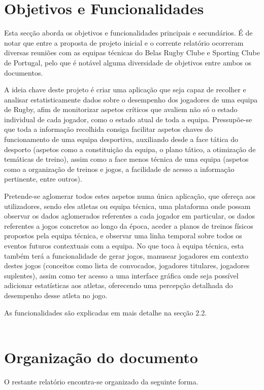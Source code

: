%
%
\section{Objetivos e Funcionalidades}\label{sec12} 

Esta secção aborda os objetivos e funcionalidades principais e secundários. É de notar que entre a proposta de projeto inicial e o corrente relatório ocorreram diversas reuniões com as equipas técnicas do Belas Rugby Clube e Sporting Clube de Portugal, pelo que é notável alguma diversidade de objetivos entre ambos os documentos.

A ideia chave deste projeto é criar uma aplicação que seja capaz de recolher e analisar estatisticamente dados sobre o desempenho dos jogadores de uma equipa de Rugby, afim de monitorizar aspetos críticos que avaliem não só o estado individual de cada jogador, como o estado atual de toda a equipa. Pressupõe-se que toda a informação recolhida consiga facilitar aspetos chaves do funcionamento de uma equipa desportiva, auxiliando desde a face tática do desporto (aspetos como a constituição da equipa, o plano tático, a otimização de temáticas de treino), assim como a face menos técnica de uma equipa (aspetos como a organização de treinos e jogos, a facilidade de acesso a informação pertinente, entre outros).

Pretende-se aglomerar todos estes aspetos numa única aplicação, que ofereça aos utilizadores, sendo eles atletas ou equipa técnica, uma plataforma onde possam observar os dados aglomerados referentes a cada jogador em particular, os dados referentes a jogos concretos ao longo da época, aceder a planos de treinos físicos propostos pela equipa técnica, e observar uma linha temporal sobre todos os eventos futuros contextuais com a equipa. No que toca à equipa técnica, esta também terá a funcionalidade de gerar jogos, manusear jogadores em contexto destes jogos (conceitos como lista de convocados, jogadores titulares, jogadores suplentes), assim como ter acesso a uma interface gráfica onde seja possível adicionar estatísticas aos atletas, oferecendo uma percepção detalhada do desempenho desse atleta no jogo. 

As funcionalidades são explicadas em mais detalhe na secção 2.2.\\
\\

\section{Organização do documento} \label{sec13}
O restante relatório encontra-se organizado da seguinte forma.\\

